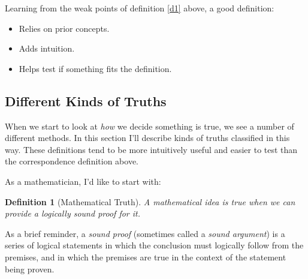 \documentclass[11pt, oneside]{article}   	%
\newtheorem{defn}{Definition}
\begin{document}
Learning from the weak points of definition \ref{d1} above, a good definition:
\begin{itemize}
    \item Relies on prior concepts.
    \item Adds intuition.
    \item Helps test if something fits the definition.
\end{itemize}


\subsection{Different Kinds of Truths}

When we start to look at {\em how} we decide something is true, we see a number
of different methods. In this section I'll describe kinds of truths classified
in this way. These definitions tend to be more intuitively useful and easier to
test than the correspondence definition above.

As a mathematician, I'd like to start with:

\begin{defn}[Mathematical Truth]
    A mathematical idea is true when we can provide a logically sound proof for
    it.
\end{defn}

As a brief reminder, a {\em sound proof} (sometimes called a
{\em sound argument}) is a series of logical statements in
which the conclusion must logically follow from the premises, and in which the
premises are true in the context of the statement being proven.
\end{document}
